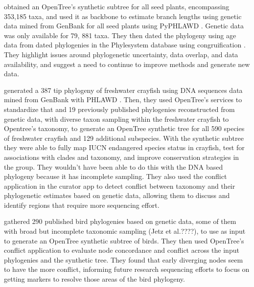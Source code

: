 \documentclass[oupdraft]{sysbio_sse}
\begin{document}
\citep{smith2018constructing} obtained an OpenTree's synthetic subtree for all seed
plants, encompassing 353,185 taxa, and used it as backbone to estimate branch lengths
using genetic data mined from GenBank for all seed plants using PyPHLAWD \citep{smith2019pyphlawd}.
Genetic data was only available for 79, 881 taxa. They then dated the phylogeny using age data
from dated phylogenies in the Phylesystem database using congruification \citep{eastman2013congruification}.
They highlight issues around phylogenetic uncertainty, data overlap, and data availability,
and suggest a need to continue to improve methods and generate new data.

\citep{owen2015synthetic} generated a 387 tip phylogeny of freshwater crayfish using DNA sequences
data mined from GenBank with PHLAWD \citep{smith2009mega}. Then, they used OpenTree's services
 to standardize that and 19 previously published phylogenies
reconstructed from genetic data, with diverse taxon sampling within the freshwater crayfish
 to Opentree's taxonomy, to generate an OpenTree synthetic tree for all 590 species
of freshwater crayfish and 129 additional subspecies.
With the synthetic subtree they were able to fully map IUCN endangered species
status in crayfish, test for associations with clades and taxonomy, and improve conservation
strategies in the group. They wouldn't have been able to do this with the DNA based phylogeny
because it has incomplete sampling.
They also used the conflict application in the curator app to detect conflict between
taxonomy and their phylogenetic estimates based on genetic data, allowing them to
discuss and identify regions that require more sequencing effort.

\citep{brown2017development} gathered 290 published bird phylogenies based on genetic
data, some of them with broad but incomplete taxonomic sampling (Jetz et al.????),
to use as input to generate an OpenTree synthetic subtree of birds.
They then used OpenTree's conflict application to evaluate node concordance and
conflict across the input phylogenies and the synthetic tree. They found that early diverging nodes
 seem to have the more conflict, informing future research sequencing efforts to
 focus on getting markers to resolve those areas of the bird phylogeny.
\end{document}
